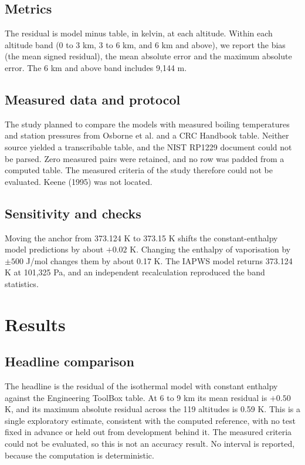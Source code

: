 \documentclass[11pt,letterpaper]{article}
\begin{document}
\subsection{Metrics}

The residual is model minus table, in kelvin, at each altitude. Within each altitude band (0 to 3 km, 3 to 6 km, and 6 km and above), we report the bias (the mean signed residual), the mean absolute error and the maximum absolute error. The 6 km and above band includes 9,144 m.

\subsection{Measured data and protocol}

The study planned to compare the models with measured boiling temperatures and station pressures from Osborne et al. \cite{Osborne1939} and a CRC Handbook table. Neither source yielded a transcribable table, and the NIST RP1229 document could not be parsed. Zero measured pairs were retained, and no row was padded from a computed table. The measured criteria of the study therefore could not be evaluated. Keene (1995) was not located.

\subsection{Sensitivity and checks}\label{sec:sensitivity}

Moving the anchor from 373.124 K to 373.15 K shifts the constant-enthalpy model predictions by about $+0.02$ K. Changing the enthalpy of vaporisation by $\pm 500$ J/mol changes them by about 0.17 K. The IAPWS model returns 373.124 K at 101,325 Pa, and an independent recalculation reproduced the band statistics.

\section{Results}\label{sec:results}

\subsection{Headline comparison}\label{sec:headline}

The headline is the residual of the isothermal model with constant enthalpy against the Engineering ToolBox table. At 6 to 9 km its mean residual is $+0.50$ K, and its maximum absolute residual across the 119 altitudes is 0.59 K. This is a single exploratory estimate, consistent with the computed reference, with no test fixed in advance or held out from development behind it. The measured criteria could not be evaluated, so this is not an accuracy result. No interval is reported, because the computation is deterministic.
\end{document}
